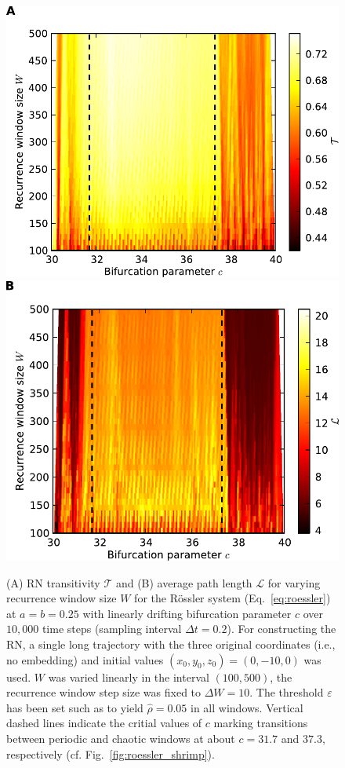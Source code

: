 \documentclass[graybox]{svmult}
\begin{document}
\begin{figure}
\centering
\includegraphics[width=0.485\columnwidth]{window_analysis_1_roessler_system.pdf} \hfill
\includegraphics[width=0.485\columnwidth]{window_analysis_0_roessler_system.pdf} 
\caption{
(A) RN transitivity $\mathcal{T}$ and (B) average path length $\mathcal{L}$ for varying recurrence window size $W$ for the R\"ossler system (Eq.~\ref{eq:roessler}) at $a=b=0.25$ with linearly drifting bifurcation parameter $c$ over $10,000$ time steps (sampling interval $\Delta t=0.2$). For constructing the RN, a single long trajectory with the three original coordinates (i.e., no embedding) and initial values $(x_0,y_0,z_0)=(0,-10,0)$ was used. $W$ was varied linearly in the interval $(100,500)$, the recurrence window step size was fixed to $\Delta W=10$. The threshold $\varepsilon$ has been set such as to yield $\hat{\rho}=0.05$ in all windows. Vertical dashed lines indicate the critial values of $c$ marking transitions between periodic and chaotic windows at about $c=31.7$ and $37.3$, respectively (cf. Fig.~\ref{fig:roessler_shrimp}).}
\label{fig:roessler_transient}
\end{figure}
\end{document}

